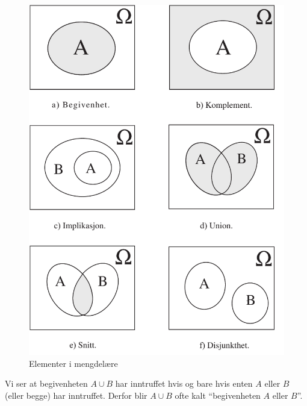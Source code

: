 \begin{figure}[ht]
\centering \centering
 \includegraphics[scale=0.7]{figurer/fig2_1.pdf}
 \caption{Elementer i mengdelære}
	\label{fig:mengdelare}
\end{figure}
\clearpage

\begin{center}  \end{center}
\noindent Vi ser at begivenheten $A \cup B$ har inntruffet hvis og bare
hvis enten $A$ eller $B$ (eller begge) har inntruffet. Derfor
blir $A \cup B$ ofte kalt ``begivenheten $A$ eller $B$''.

